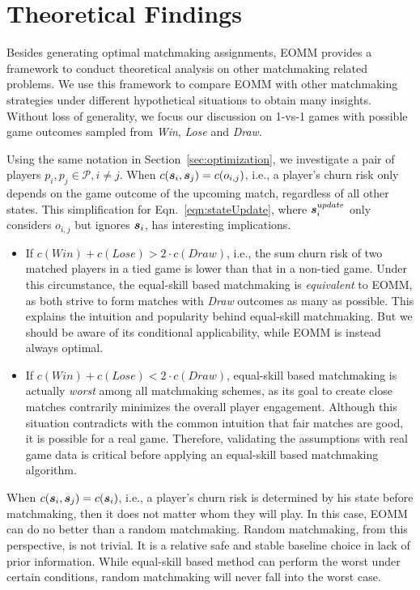 \section{Theoretical Findings}\label{sec:findings}
Besides generating optimal matchmaking assignments, EOMM provides a framework to conduct theoretical analysis on other matchmaking related problems. We use this framework to compare EOMM with other matchmaking strategies under different hypothetical situations to obtain many insights. Without loss of generality, we focus our discussion on 1-vs-1 games with possible game outcomes sampled from \emph{Win}, \emph{Lose} and \emph{Draw}.

Using the same notation in Section~\ref{sec:optimization}, we investigate a pair of players $p_i, p_j \in \mathcal{P}, i \neq j$. When $c(\boldsymbol{s}_i, \boldsymbol{s}_j) = c(o_{i,j})$, i.e., a player's churn risk only depends on the game outcome of the upcoming match, regardless of all other states. This simplification for Eqn.~\ref{eqn:stateUpdate}, where $\boldsymbol{s}_i^{update}$ only considers $o_{i,j}$ but ignores $\boldsymbol{s}_i$, has  interesting implications.
\begin{itemize}
\item If $c(Win)+c(Lose) > 2\cdot c(Draw)$, i.e., the sum churn risk of two matched players in a tied game is lower than that in a non-tied game. Under this circumstance, the equal-skill based matchmaking is \emph{equivalent} to EOMM, as both strive to form matches with \emph{Draw} outcomes as many as possible. This explains the intuition and popularity behind equal-skill matchmaking. But we should be aware of its conditional applicability, while EOMM is instead always optimal.
\item If $c(Win) + c(Lose)< 2\cdot c(Draw)$, equal-skill based matchmaking is actually \emph{worst} among all matchmaking schemes, as its goal to create close matches contrarily minimizes the overall player engagement. Although this situation contradicts with the common intuition that fair matches are good, it is possible for a real game. Therefore, validating the assumptions with real game data is critical before applying an equal-skill based matchmaking algorithm.
\end{itemize}

When $c(\boldsymbol{s}_i, \boldsymbol{s}_j) = c(\boldsymbol{s}_i)$, i.e., a player's churn risk is determined by his state before matchmaking, then it does not matter whom they will play. In this case, EOMM can do no better than a random matchmaking. Random matchmaking, from this perspective, is not trivial. It is a relative safe and stable baseline choice in lack of prior information. While equal-skill based method can perform the worst under certain conditions, random matchmaking will never fall into the worst case.

